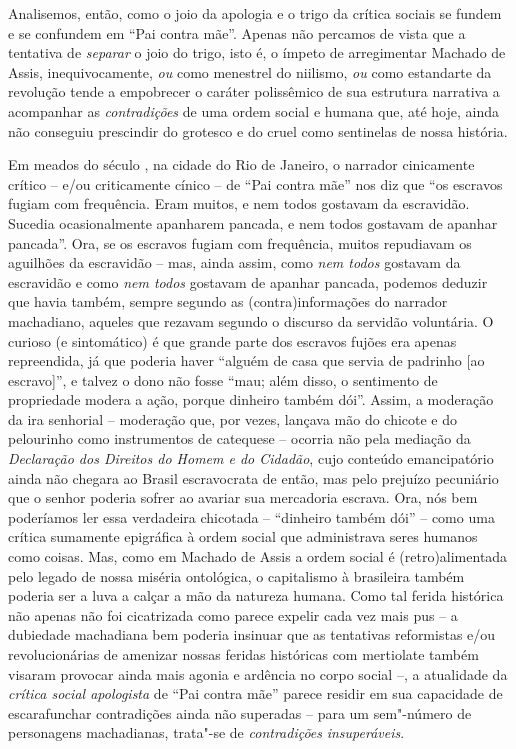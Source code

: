 Analisemos, então, como o joio da apologia e o trigo da crítica sociais
se fundem e se confundem em ``Pai contra mãe''. Apenas não percamos de
vista que a tentativa de \emph{separar} o joio do trigo, isto é, o
ímpeto de arregimentar Machado de Assis, inequivocamente, \emph{ou} como
menestrel do niilismo, \emph{ou} como estandarte da revolução tende a
empobrecer o caráter polissêmico de sua estrutura narrativa a acompanhar
as \emph{contradições} de uma ordem social e humana que, até hoje, ainda
não conseguiu prescindir do grotesco e do cruel como sentinelas de nossa
história.

\medskip
\asterisc
\medskip

Em meados do século , na cidade do Rio de Janeiro, o narrador
cinicamente crítico -- e/ou criticamente cínico -- de ``Pai contra mãe''
nos diz que ``os escravos fugiam com frequência. Eram muitos, e nem
todos gostavam da escravidão. Sucedia ocasionalmente apanharem pancada,
e nem todos gostavam de apanhar pancada''. Ora, se os escravos fugiam
com frequência, muitos repudiavam os aguilhões da escravidão -- mas,
ainda assim, como \emph{nem todos} gostavam da escravidão e como
\emph{nem todos} gostavam de apanhar pancada, podemos deduzir que havia
também, sempre segundo as (contra)informações do narrador machadiano,
aqueles que rezavam segundo o discurso da servidão voluntária. O curioso
(e sintomático) é que grande parte dos escravos fujões era apenas
repreendida, já que poderia haver ``alguém de casa que servia de
padrinho {[}ao escravo{]}'', e talvez o dono não fosse ``mau; além
disso, o sentimento de propriedade modera a ação, porque dinheiro também
dói''. Assim, a moderação da ira senhorial -- moderação que, por vezes,
lançava mão do chicote e do pelourinho como instrumentos de catequese --
ocorria não pela mediação da \emph{Declaração dos Direitos do Homem e do
Cidadão}, cujo conteúdo emancipatório ainda não chegara ao Brasil
escravocrata de então, mas pelo prejuízo pecuniário que o senhor poderia
sofrer ao avariar sua mercadoria escrava. Ora, nós bem poderíamos ler
essa verdadeira chicotada -- ``dinheiro também dói'' -- como uma crítica
sumamente epigráfica à ordem social que administrava seres humanos como
coisas. Mas, como em Machado de Assis a ordem social é (retro)alimentada
pelo legado de nossa miséria ontológica, o capitalismo à brasileira
também poderia ser a luva a calçar a mão da natureza humana. Como tal
ferida histórica não apenas não foi cicatrizada como parece expelir cada
vez mais pus -- a dubiedade machadiana bem poderia insinuar que as
tentativas reformistas e/ou revolucionárias de amenizar nossas feridas
históricas com mertiolate também visaram provocar ainda mais agonia e
ardência no corpo social --, a atualidade da \emph{crítica social
apologista} de ``Pai contra mãe'' parece residir em sua capacidade de
escarafunchar contradições ainda não superadas -- para um sem"-número de
personagens machadianas, trata"-se de \emph{contradições}
\emph{insuperáveis}.

